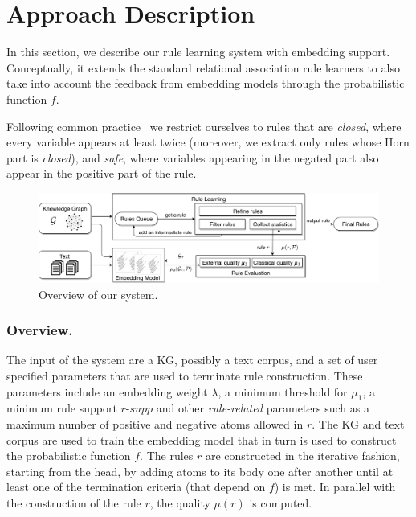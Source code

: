 

\section{Approach Description} 
\label{sec:sys}

In this section, we describe our rule learning system with embedding support. 
Conceptually, 
it extends the standard relational association rule learners \cite{amie,DBLP:conf/esf/GoethalsB02} to also take into account the feedback from embedding models through the probabilistic function $f$. 

Following common practice~\cite{amie} we restrict ourselves to rules that are \emph{closed}, where every variable appears at least twice (moreover, we extract only rules whose Horn part is \emph{closed}), and \emph{safe}, where variables appearing in the negated part also appear in the positive part of the rule.

\begin{figure}[t]
\centering
\includegraphics[width=1\textwidth]{figures/system_overview_H.pdf}
\caption{Overview of our system.}
\label{fig:system}
\end{figure}


\subsubsection{Overview.}
The input of the system are a KG, possibly a text corpus, and a set of user specified parameters that are used to terminate rule construction.
These parameters include an embedding weight $\lambda$, 
a minimum threshold 
for $\mu_1$,  
a minimum rule support $\textit{r-supp}$ 
and other \emph{rule-related} parameters such as a maximum number of positive 
and negative 
atoms allowed in $r$.
The KG and text corpus are used to train the embedding model that in turn is used to construct the probabilistic function $f$.
The rules $r$ are constructed in the iterative fashion, starting from the head, by adding atoms to its body one after another until at least one of the termination criteria (that depend on $f$) is met.
In parallel with the construction of the rule $r$, the quality $\mu(r)$ is computed.


